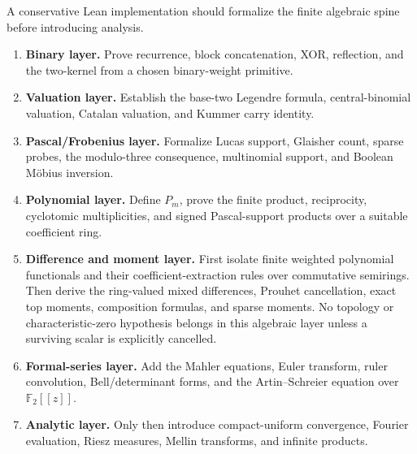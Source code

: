 \documentclass[11pt,oneside]{article}
\numberwithin{equation}{section}
\theoremstyle{definition}
\theoremstyle{remark}
\newcommand{\Ftwo}{\mathbb F_2}
\begin{document}
A conservative Lean implementation should formalize the finite algebraic
spine before introducing analysis.

\begin{enumerate}
\item \textbf{Binary layer.}  Prove recurrence, block concatenation, XOR,
      reflection, and the two-kernel from a chosen binary-weight primitive.
\item \textbf{Valuation layer.}  Establish the base-two Legendre formula,
      central-binomial valuation, Catalan valuation, and Kummer carry identity.
\item \textbf{Pascal/Frobenius layer.}  Formalize Lucas support, Glaisher count,
      sparse probes, the modulo-three consequence, multinomial support, and
      Boolean M\"obius inversion.
\item \textbf{Polynomial layer.}  Define \(P_m\), prove the finite product,
      reciprocity, cyclotomic multiplicities, and signed Pascal-support
      products over a suitable coefficient ring.
\item \textbf{Difference and moment layer.}  First isolate finite weighted
      polynomial functionals and their coefficient-extraction rules over
      commutative semirings.  Then derive the ring-valued mixed differences,
      Prouhet cancellation, exact top moments, composition formulas, and sparse
      moments.  No topology or characteristic-zero hypothesis belongs in this
      algebraic layer unless a surviving scalar is explicitly cancelled.
\item \textbf{Formal-series layer.}  Add the Mahler equations, Euler transform,
      ruler convolution, Bell/determinant forms, and the Artin--Schreier
      equation over \(\Ftwo[[z]]\).
\item \textbf{Analytic layer.}  Only then introduce compact-uniform convergence,
      Fourier evaluation, Riesz measures, Mellin transforms, and infinite
      products.
\end{enumerate}
\end{document}
